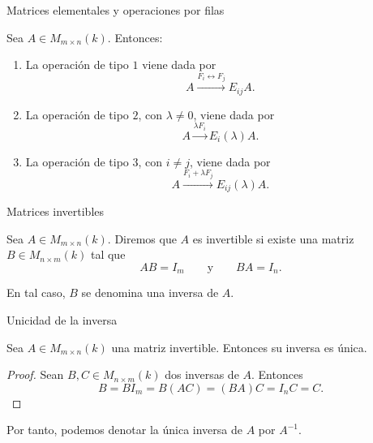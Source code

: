 \begin{frame}{Matrices elementales y operaciones por filas}

\begin{proposition}
Sea \(A\in M_{m\times n}(k)\). Entonces:

\begin{enumerate}

\item La operación de tipo \(1\) viene dada por
\[
A
\xrightarrow{F_i\leftrightarrow F_j}
E_{ij}A.
\]

\item La operación de tipo \(2\), con \(\lambda\neq0\), viene dada por
\[
A
\xrightarrow{\lambda F_i}
E_i(\lambda)A.
\]

\item La operación de tipo \(3\), con \(i\neq j\), viene dada por
\[
A
\xrightarrow{F_i+\lambda F_j}
E_{ij}(\lambda)A.
\]

\end{enumerate}
\end{proposition}


\end{frame}

\begin{frame}{Matrices invertibles}

\begin{definition}
Sea \(A\in M_{m\times n}(k)\). Diremos que \(A\) es
\alert{invertible} si existe una matriz \(B\in M_{n\times m}(k)\)
tal que
\[
AB=I_m
\qquad\text{y}\qquad
BA=I_n.
\]

En tal caso, \(B\) se denomina una \alert{inversa} de \(A\).
\end{definition}

\end{frame}

\begin{frame}{Unicidad de la inversa}

\begin{proposition}
Sea \(A\in M_{m\times n}(k)\) una matriz invertible. Entonces su
inversa es única.
\end{proposition}

\begin{proof}
Sean \(B,C\in M_{n\times m}(k)\) dos inversas de \(A\). Entonces
\[
B
=BI_m
=B(AC)
=(BA)C
=I_nC
=C.
\]
\end{proof}

Por tanto, podemos denotar la única \alert{inversa de \(A\)} por
\alert{\(A^{-1}.\)}

\end{frame}

